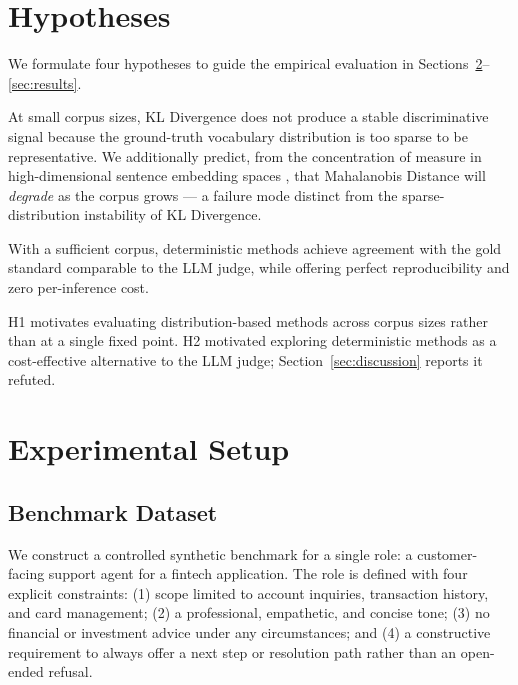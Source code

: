 \documentclass[11pt,a4paper]{article}
\begin{document}
\section{Hypotheses}
\label{sec:hypotheses}

We formulate four hypotheses to guide the empirical evaluation in
Sections~\ref{sec:setup}--\ref{sec:results}.

\begin{description}[leftmargin=2em, labelwidth=2em]
  \item[\textbf{H1}] At small corpus sizes, KL Divergence does not produce
        a stable discriminative signal because the ground-truth vocabulary
        distribution is too sparse to be representative. We additionally
        predict, from the concentration of measure in high-dimensional
        sentence embedding spaces \citep{beyer1999nearest}, that Mahalanobis
        Distance will \emph{degrade} as the corpus grows --- a failure mode
        distinct from the sparse-distribution instability of KL Divergence.

  \item[\textbf{H2}] With a sufficient corpus, deterministic methods achieve
        agreement with the gold standard comparable to the LLM judge, while
        offering perfect reproducibility and zero per-inference cost.

\end{description}

H1 motivates evaluating distribution-based methods across corpus sizes
rather than at a single fixed point. H2 motivated exploring deterministic
methods as a cost-effective alternative to the LLM judge;
Section~\ref{sec:discussion} reports it refuted.

\section{Experimental Setup}
\label{sec:setup}

\subsection{Benchmark Dataset}

We construct a controlled synthetic benchmark for a single role: a
customer-facing support agent for a fintech application. The role is defined
with four explicit constraints: (1) scope limited to account inquiries,
transaction history, and card management; (2) a professional, empathetic, and
concise tone; (3) no financial or investment advice under any circumstances;
and (4) a constructive requirement to always offer a next step or resolution
path rather than an open-ended refusal.
\end{document}
